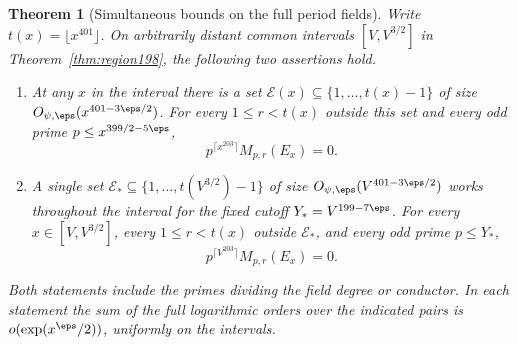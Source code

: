 \documentclass[a4paper,11pt]{article}
\newtheorem{theorem}[proposition]{Theorem}
\theoremstyle{definition}
\theoremstyle{remark}
\numberwithin{equation}{section}
\begin{document}
\begin{theorem}[Simultaneous bounds on the full period fields]
\label{thm:all202}
Write \(t(x)=\lfloor x^{401}\rfloor\). On arbitrarily distant
common intervals \([V,V^{3/2}]\) in Theorem~\ref{thm:region198},
the following two assertions hold.
\begin{enumerate}
\item At any \(x\) in the interval there is a set
\(\mathcal E(x)\subseteq\{1,\ldots,t(x)-1\}\) of size
\(O_{\psi,\eps}(x^{401-3\eps/2})\). For every \(1\le r<t(x)\) outside
this set and every odd prime \(p\le x^{399/2-5\eps}\),
\[
                   p^{\lceil x^{203}\rceil}M_{p,r}(E_x)=0 .
\]
\item A single set \(\mathcal E_*\subseteq
\{1,\ldots,t(V^{3/2})-1\}\) of size
\(O_{\psi,\eps}(V^{401-3\eps/2})\) works throughout the interval
for the fixed cutoff \(Y_*=V^{199-7\eps}\). For every
\(x\in[V,V^{3/2}]\), every \(1\le r<t(x)\) outside
\(\mathcal E_*\), and every odd prime \(p\le Y_*\),
\[
                    p^{\lceil V^{203}\rceil}M_{p,r}(E_x)=0 .
\]
\end{enumerate}
Both statements include the primes dividing the field degree
or conductor. In each statement the sum of the full logarithmic
orders over the indicated pairs is \(o(\exp(x^\eps/2))\), uniformly
on the intervals.
\end{theorem}
\end{document}
